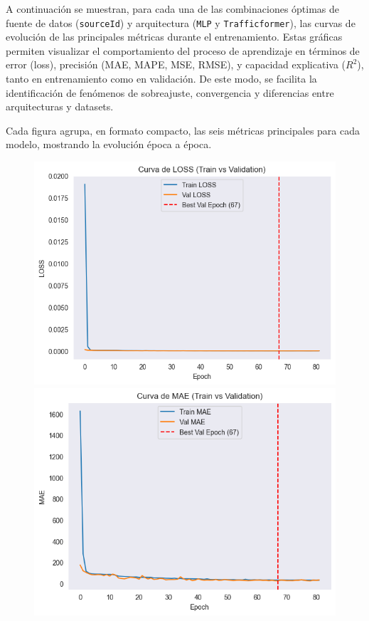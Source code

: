 
A continuación se muestran, para cada una de las combinaciones óptimas de fuente de datos (\texttt{sourceId}) y arquitectura (\texttt{MLP} y \texttt{Trafficformer}), las curvas de evolución de las principales métricas durante el entrenamiento. Estas gráficas permiten visualizar el comportamiento del proceso de aprendizaje en términos de error (loss), precisión (MAE, MAPE, MSE, RMSE), y capacidad explicativa ($R^2$), tanto en entrenamiento como en validación. De este modo, se facilita la identificación de fenómenos de sobreajuste, convergencia y diferencias entre arquitecturas y datasets.

Cada figura agrupa, en formato compacto, las seis métricas principales para cada modelo, mostrando la evolución época a época.

\begin{figure}[H]
	\centering
	\begin{minipage}{0.48\textwidth}
		\centering
		\includegraphics[width=\linewidth]{includes/cap5/graphs/sid1_mlp_loss.png}
		\vspace{0.2cm}
		\includegraphics[width=\linewidth]{includes/cap5/graphs/sid1_mlp_mae.png}

\end{minipage}
\end{figure}
